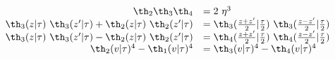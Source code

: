 \begin{equation} \label{t13}
  \begin{array}{rl}
\th_2 \th_3 \th_4 &= 2~\eta^3 \\  
\th_3(z|\tau)~\th_3(z'|\tau) + \th_2(z|\tau)~\th_2(z'|\tau)
&= \th_3({z+z'\over 2}|{\tau\over 2})~\th_3({z-z'\over 2}|{\tau\over 2}) \\
\th_3(z|\tau)~\th_3(z'|\tau) - \th_2(z|\tau)~\th_2(z'|\tau)
&= \th_4({z+z'\over 2}|{\tau\over 2})~\th_4({z-z'\over 2}|{\tau\over 2}) \\
\th_2(v|\tau)^4-\th_1(v|\tau)^4 &=\th_3(v|\tau)^4-\th_4(v|\tau)^4
  \end{array}
\end{equation}


